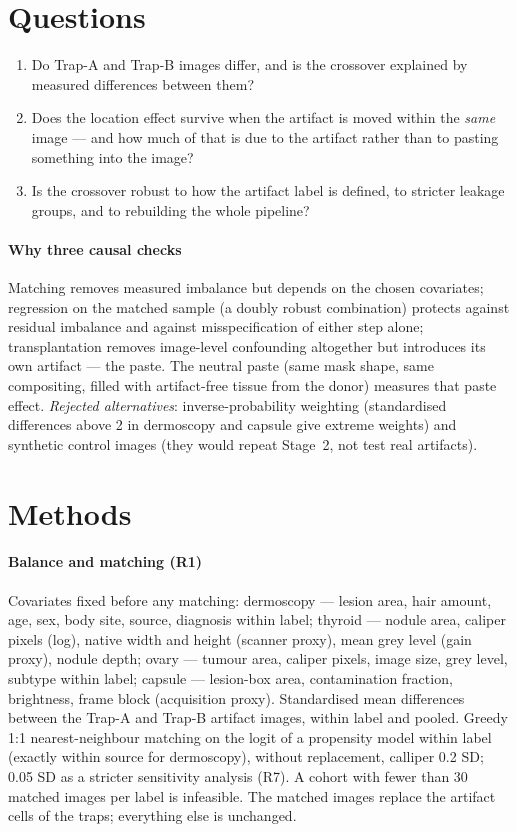 \section{Questions}
\begin{enumerate}[label=\textbf{Q4\alph*},leftmargin=*]\itemsep1pt
\item Do Trap-A and Trap-B images differ, and is the crossover explained by measured differences between them?
\item Does the location effect survive when the artifact is moved within the \emph{same} image --- and how much of that
is due to the artifact rather than to pasting something into the image?
\item Is the crossover robust to how the artifact label is defined, to stricter leakage groups, and to rebuilding the
whole pipeline?
\end{enumerate}
\paragraph{Why three causal checks} Matching removes measured imbalance but depends on the chosen covariates;
regression on the matched sample (a doubly robust combination) protects against residual imbalance and against
misspecification of either step alone; transplantation removes image-level confounding altogether but introduces its
own artifact --- the paste. The neutral paste (same mask shape, same compositing, filled with artifact-free tissue from
the donor) measures that paste effect. \emph{Rejected alternatives}: inverse-probability weighting (standardised
differences above 2 in dermoscopy and capsule give extreme weights) and synthetic control images (they would repeat
Stage~2, not test real artifacts).

\section{Methods}
\paragraph{Balance and matching (R1)} Covariates fixed before any matching: dermoscopy --- lesion area, hair amount,
age, sex, body site, source, diagnosis within label; thyroid --- nodule area, caliper pixels (log), native width and
height (scanner proxy), mean grey level (gain proxy), nodule depth; ovary --- tumour area, caliper pixels, image size,
grey level, subtype within label; capsule --- lesion-box area, contamination fraction, brightness, frame block (acquisition
proxy). Standardised mean differences between the Trap-A and Trap-B artifact images, within label and pooled. Greedy
1:1 nearest-neighbour matching on the logit of a propensity model within label (exactly within source for dermoscopy),
without replacement, calliper 0.2 SD; 0.05 SD as a stricter sensitivity analysis (R7). A cohort with fewer than 30
matched images per label is infeasible. The matched images replace the artifact cells of the traps; everything else is
unchanged.
